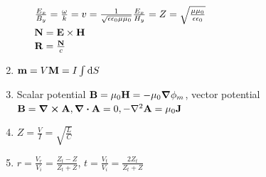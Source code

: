 \documentclass{article}
\theoremstyle{remark}
\begin{document}
\begin{enumerate}
\begin{itemize}
                    $\frac{E_x}{B_y}=\frac{\omega}{k}=v=\frac{1}{\sqrt{\epsilon\epsilon_0\mu\mu_0}}\\
                        \frac{E_x}{H_y}=Z=\sqrt{\frac{\mu\mu_0}{\epsilon\epsilon_0}}$\\
                    $\vb{N}=\vb{E}\times\vb{H}$\\
                    $\vb{R}=\frac{\vb{N}}{c}$
        \end{itemize}
    \item $\vb{m}=V\vb{M}=I\int\dd S$
    \item Scalar potential $\vb{B}=\mu_0\vb{H}=-\mu_0\grad\vb{\phi}_m$, vector potential $\vb{B}=\curl\vb{A}, \div\vb{A}=0, -\laplacian{\vb{A}}=\mu_0\vb{J}$
    \item $Z=\frac{V}{I}=\sqrt{\frac{L}{C}}$
    \item $r=\frac{V_r}{V_i}=\frac{Z_t-Z}{Z_t+Z}$, $t=\frac{V_t}{V_i}=\frac{2Z_t}{Z_t+Z}$
\end{enumerate}
\end{document}
